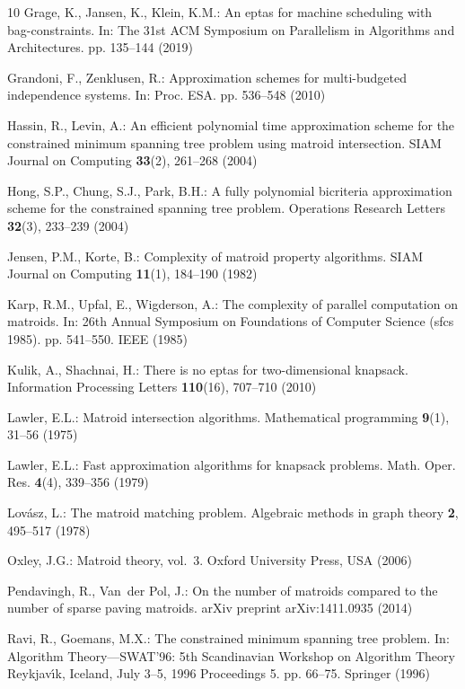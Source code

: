 \documentclass[11pt,letter]{article}
\begin{document}
\begin{thebibliography}{10}
Grage, K., Jansen, K., Klein, K.M.: An eptas for machine scheduling with
  bag-constraints. In: The 31st ACM Symposium on Parallelism in Algorithms and
  Architectures. pp. 135--144 (2019)

Grandoni, F., Zenklusen, R.: Approximation schemes for multi-budgeted
  independence systems. In: Proc. ESA. pp. 536--548 (2010)

Hassin, R., Levin, A.: An efficient polynomial time approximation scheme for
  the constrained minimum spanning tree problem using matroid intersection.
  SIAM Journal on Computing  \textbf{33}(2),  261--268 (2004)

Hong, S.P., Chung, S.J., Park, B.H.: A fully polynomial bicriteria
  approximation scheme for the constrained spanning tree problem. Operations
  Research Letters  \textbf{32}(3),  233--239 (2004)

Jensen, P.M., Korte, B.: Complexity of matroid property algorithms. SIAM
  Journal on Computing  \textbf{11}(1),  184--190 (1982)

Karp, R.M., Upfal, E., Wigderson, A.: The complexity of parallel computation on
  matroids. In: 26th Annual Symposium on Foundations of Computer Science (sfcs
  1985). pp. 541--550. IEEE (1985)

Kulik, A., Shachnai, H.: There is no eptas for two-dimensional knapsack.
  Information Processing Letters  \textbf{110}(16),  707--710 (2010)

Lawler, E.L.: Matroid intersection algorithms. Mathematical programming
  \textbf{9}(1),  31--56 (1975)

Lawler, E.L.: Fast approximation algorithms for knapsack problems. Math. Oper.
  Res.  \textbf{4}(4),  339--356 (1979)

Lov{\'a}sz, L.: The matroid matching problem. Algebraic methods in graph theory
   \textbf{2},  495--517 (1978)

Oxley, J.G.: Matroid theory, vol.~3. Oxford University Press, USA (2006)

Pendavingh, R., Van~der Pol, J.: On the number of matroids compared to the
  number of sparse paving matroids. arXiv preprint arXiv:1411.0935  (2014)

Ravi, R., Goemans, M.X.: The constrained minimum spanning tree problem. In:
  Algorithm Theory—SWAT'96: 5th Scandinavian Workshop on Algorithm Theory
  Reykjav{\'\i}k, Iceland, July 3--5, 1996 Proceedings 5. pp. 66--75. Springer
  (1996)


\end{thebibliography}
\end{document}
